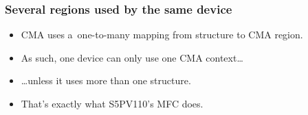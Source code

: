 \begin{frame}
  \frametitle{Several regions used by the same device}

  \begin{itemize}
  \item CMA uses a~one-to-many mapping from  structure
    to CMA region.
  \item As such, one device can only use one CMA context\ldots
  \item \ldots unless it uses more than one 
    structure.
  \item That's exactly what S5PV110's MFC does.
  \end{itemize}
\end{frame}
